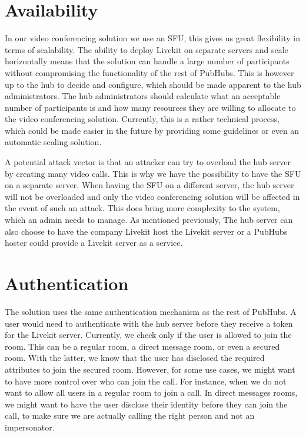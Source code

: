 \documentclass{report}
\begin{document}
\section{Availability}
In our video conferencing solution we use an SFU, this gives us great flexibility in terms of scalability. The
ability to deploy Livekit on separate servers and scale horizontally means that the solution can handle a large
number of participants without compromising the functionality of the rest of PubHubs. This is however up to the hub
to decide and configure, which should be made apparent to the hub administrators. The hub administrators should
calculate what an acceptable number of participants is and how many resources they are willing to allocate to the
video conferencing solution. Currently, this is a rather technical process, which could be made easier in the future
by providing some guidelines or even an automatic scaling solution.

A potential attack vector is that an attacker can try to overload the hub server by creating many video calls. This
is why we have the possibility to have the SFU on a separate server. When having the SFU on a different server, the hub
server will not be overloaded and only the video conferencing solution will be affected in the event of such an attack.
This does bring more complexity to the system, which an admin needs to manage. As mentioned previously, The hub server
can also choose to have the company Livekit host the Livekit server or a PubHubs hoster could provide a Livekit server as a service.

\section{Authentication}
The solution uses the same authentication mechanism as the rest of PubHubs. A user would need to authenticate with the
hub server before they receive a token for the Livekit server. Currently, we check only if the user is allowed to
join the room. This can be a regular room, a direct message room, or even a secured room. With the latter, we know
that the user has disclosed the required attributes to join the secured room. However, for some use cases, we might
want to have more control over who can join the call. For instance, when we do not want to allow all users in a
regular room to join a call. In direct messages rooms, we might want to have the user disclose their identity
before they can join the call, to make sure we are actually calling the right person and not an impersonator.
\end{document}
